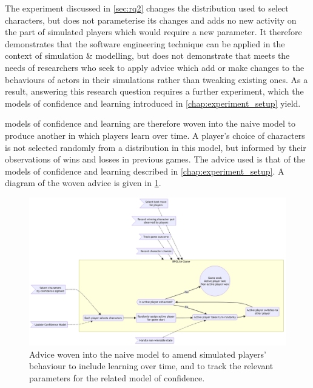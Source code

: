 \begin{researchquestion}
\rqthree{}
\end{researchquestion}


The experiment discussed in \cref{sec:rq2} changes the distribution used to
select characters, but does not parameterise its changes and adds no new
activity on the part of simulated players which would require a new parameter.
It therefore demonstrates that the software engineering technique can be applied
in the context of simulation \& modelling, but does not demonstrate that \aop
meets the needs of researchers who seek to apply advice which add or make changes to
the behaviours of actors in their simulations rather than tweaking existing
ones. As a result, answering this research question requires a further
experiment, which the \aspectoriented models of confidence and learning
introduced in \cref{chap:experiment_setup} yield.

\Aspectoriented{} models of confidence and learning are therefore woven into the naive model to
produce another in which players learn over time. A player's choice of
characters is not selected randomly from a distribution in this model, but
informed by their observations of wins and losses in previous games. The advice
used is that of the models of confidence and learning described in
\cref{chap:experiment_setup}. A diagram of the woven advice is given in
\cref{fig:learning_model_software_diagram}.

\begin{figure}[h]
  \centering
  \includegraphics[width=\columnwidth]{70_generality_of_aspects/diagrams/exp3_learning_model.png}
  \caption{Advice woven into the naive model to amend simulated players' behaviour to include learning over time, and to track the relevant parameters for the related model of confidence.}
  \label{fig:learning_model_software_diagram}
\end{figure}

